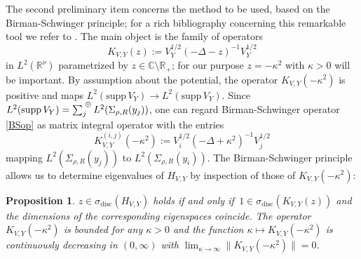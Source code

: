 \documentclass{article}
\numberwithin{equation}{section}
\newtheorem{proposition}[theorem]{Proposition}
\theoremstyle{definition}
\newcommand{\R}{\mathbb{R}}
\newcommand{\sumoplus}{\!\raisebox{1.5ex}{{\scriptsize $\oplus$}}}
\begin{document}
The second preliminary item concerns the method to be used, based on the Birman-Schwinger principle; for a rich bibliography concerning this remarkable tool we refer to \cite{BEG22}. The main object is the family of operators
 \begin{equation} \label{BSop}
K_{V,Y}(z) := V_Y^{1/2} (-\Delta-z)^{-1} V_Y^{1/2}
 \end{equation}
in $L^2(\R^\nu)$ parametrized by $z\in\mathbb{C}\setminus\R_+$; for our purpose $z=-\kappa^2$ with $\kappa>0$ will be important. By assumption about the potential, the operator $K_{V,Y}(-\kappa^2)$ is positive and maps $L^2(\mathrm{supp}\,V_Y) \to L^2(\mathrm{supp}\,V_Y)$. Since $L^2(\mathrm{supp}\,V_Y) = \sum_j{\!\sumoplus}\: L^2(\Sigma_{\rho,R}(y_j))$, one can regard Birman-Schwinger operator \eqref{BSop} as matrix integral operator with the entries
 \begin{equation} \label{BSmatrix}
K_{V,Y}^{(i,j)}(-\kappa^2) := V_i^{1/2} (-\Delta+\kappa^2)^{-1} V_j^{1/2}
 \end{equation}
mapping $L^2(\Sigma_{\rho,R}(y_j))$ to $L^2(\Sigma_{\rho,R}(y_i))$. The Birman-Schwinger principle allows us to determine eigenvalues of $H_{V,Y}$ by inspection of those of $K_{V,Y}(-\kappa^2)$:
\begin{proposition} \label{prop:BS}
$z\in\sigma_\mathrm{disc}(H_{V,Y})$ holds if and only if $\,1\in\sigma_\mathrm{disc}(K_{V,Y}(z))$ and the dimensions of the corresponding eigenspaces coincide. The
operator $K_{V,Y}(-\kappa^2)$ is bounded for any $\kappa>0$ and the function $\kappa \mapsto K_{V,Y}(-\kappa^2)$ is continuously decreasing in $(0,\infty)$ with $\lim_{\kappa\to\infty}\|K_{V,Y}(-\kappa^2)\|=0$.
\end{proposition}
\end{document}
